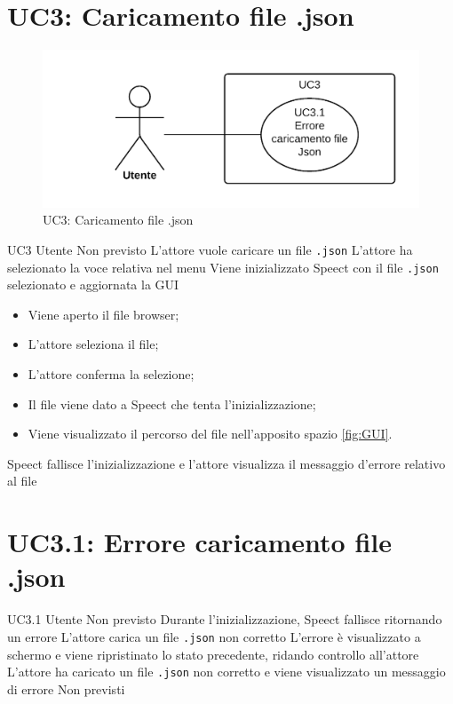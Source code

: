 \documentclass[../AnalisideiRequisiti.tex]{subfiles}
\begin{document}
	\section{UC3: Caricamento file .json}
	\begin{figure}[H]
		\centering
		\includegraphics[width=\textwidth]{../img/UC3.png}
		\caption{UC3: Caricamento file .json}
	\end{figure}
	\UserCase
	{UC3}
	{Utente}
	{Non previsto}
	{L'attore vuole caricare un file \verb|.json|}
	{L'attore ha selezionato la voce relativa nel menu }
	{Viene inizializzato Speect con il file \verb|.json| selezionato e aggiornata la GUI}
	{
		\begin{itemize}
			\item{} Viene aperto il file browser;
			\item{} L'attore seleziona il file;
			\item{} L'attore conferma la selezione;
			\item{} Il file viene dato a Speect che tenta l'inizializzazione;
			\item{} Viene visualizzato il percorso del file nell'apposito spazio \ref{fig:GUI}.
		\end{itemize}
	}
	{Speect fallisce l'inizializzazione e l'attore visualizza il messaggio d'errore relativo al file }
	
	\section{UC3.1: Errore caricamento file .json}
	\UserCase
	{UC3.1}
	{Utente}
	{Non previsto}
	{Durante l'inizializzazione, Speect fallisce ritornando un errore}
	{L'attore carica un file \verb|.json| non corretto}
	{L'errore è visualizzato a schermo e viene ripristinato lo stato precedente, ridando controllo all'attore}
	{L'attore ha caricato un file \verb|.json| non corretto e viene visualizzato un messaggio di errore}
	{Non previsti}
\end{document}
